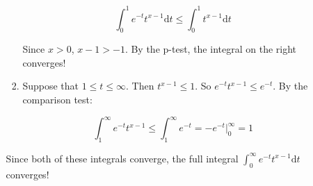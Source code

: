\begin{enumerate}
\begin{enumerate}
\begin{enumerate}
            \[
                \int_0^1 e^{-t}t^{x-1} \mathrm dt \leq \int_0^1 t^{x-1} \mathrm dt 
            \]

            Since $x>0$, $x-1>-1$. By the p-test, the integral on the right converges!

            \item Suppose that $1 \leq t \leq \infty$. Then $t^{x-1} \leq 1$. So $e^{-t}t^{x-1} \leq e^{-t}$. By the comparison test:

            \[
            \int_1^\infty e^{-t} t^{x-1} \leq \int_1^\infty e^{-t} = -e^{-t}|_0^\infty = 1
            \]
        \end{enumerate}
        Since both of these integrals converge, the full integral $\int_0^\infty e^{-t}t^{x-1}\mathrm dt$ converges! 
        
    \end{enumerate}
\end{enumerate}